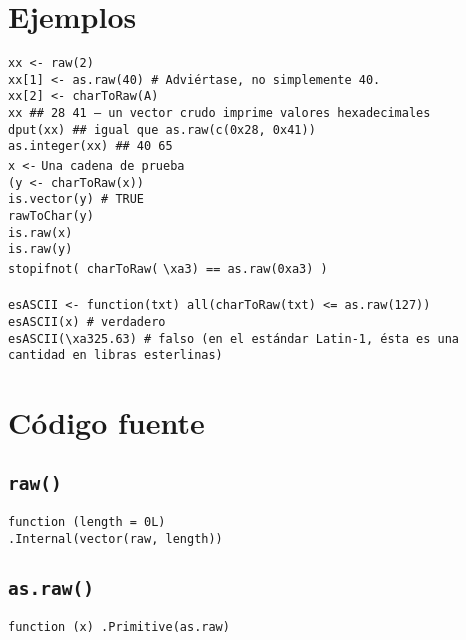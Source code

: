 \documentclass{article}[letter, 12pt]
\newlength\tindent
\renewcommand{\indent}{\hspace*{\tindent}}
\def\code#1{\texttt{#1}}
\begin{document}
\section{\color{gray}Ejemplos}
\indent\code{xx <- raw(2)} \\
\indent\code{xx[1] <- as.raw(40)     \# Adviértase, no simplemente 40.} \\
\indent\code{xx[2] <- charToRaw(}\textquotedbl\code{A}\textquotedbl\code{)} \\
\indent\code{xx       \#\# 28 41   -- un vector crudo imprime valores hexadecimales} \\
\indent\code{dput(xx) \#\# igual que as.raw(c(0x28, 0x41))} \\
\indent\code{as.integer(xx) \#\# 40 65} \\
\indent\code{x <-} \textquotedbl\code{Una cadena de prueba}\textquotedbl\ \\
\indent\code{(y <- charToRaw(x))} \\
\indent\code{is.vector(y) \# TRUE} \\
\indent\code{rawToChar(y)} \\
\indent\code{is.raw(x)} \\
\indent\code{is.raw(y)} \\
\indent\code{stopifnot( charToRaw(} \textquotedbl\code{\textbackslash xa3}\textquotedbl\code{) == as.raw(0xa3) )} \\\\
\indent\code{esASCII <-  function(txt) all(charToRaw(txt) <= as.raw(127))} \\
\indent\code{esASCII(x)  \# verdadero} \\
\indent\code{esASCII(}\textquotedbl\code{\textbackslash xa325.63}\textquotedbl\code{) \# falso (en el estándar Latin-1, ésta es una cantidad en libras esterlinas)} \\

\section{\color{gray}Código fuente}
\subsection{\color{gray} \code{raw()}}
\indent\code{function (length = 0L) } \\
\indent\indent\code{.Internal(vector(\textquotedbl\code{raw}\textquotedbl, length))}\\
\subsection{\color{gray}\code{as.raw()}}
\indent\code{function (x) .Primitive(\textquotedbl\code{as.raw}\textquotedbl)} \\
\end{document}
